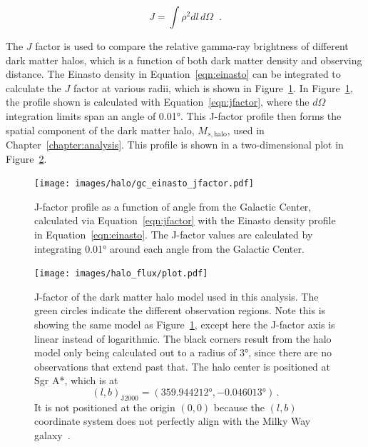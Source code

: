     \begin{equation}\label{eqn:jfactor}
      J = \int \rho^2 dl\,d\Omega \;\; .
    \end{equation}

    The $J$ factor is used to compare the relative gamma-ray brightness of different dark matter halos, which is a function of both dark matter density and observing distance.
    The Einasto density in Equation~\ref{eqn:einasto} can be integrated to calculate the $J$ factor at various radii, which is shown in Figure~\ref{fig:gchalo_jfactor}.
    In Figure~\ref{fig:gchalo_jfactor}, the profile shown is calculated with Equation~\ref{eqn:jfactor}, where the $d\Omega$ integration limits span an angle of \ang{0.01}.
    This J-factor profile then forms the spatial component of the dark matter halo, $M_{s,\textrm{halo}}$, used in Chapter~\ref{chapter:analysis}.
    This profile is shown in a two-dimensional plot in Figure~\ref{fig:halojfactor}.
    
    \begin{figure}[!t]
    \centering
      \texttt{[image: images/halo/gc\_einasto\_jfactor.pdf]}
      \caption[Galactic Center Einasto Halo J-Factor]{
        J-factor profile as a function of angle from the Galactic Center, calculated via Equation~\ref{eqn:jfactor} with the Einasto density profile in Equation~\ref{eqn:einasto}.
        The J-factor values are calculated by integrating \ang{0.01} around each angle from the Galactic Center.
      }
      \label{fig:gchalo_jfactor}
    \end{figure}
  
  \begin{figure}[!t]
    \centering
    \texttt{[image: images/halo\_flux/plot.pdf]}
    \caption[Galactic Center Halo J-Factor Sky Map]{
      J-factor of the dark matter halo model used in this analysis.
      The green circles indicate the different observation regions.
      Note this is showing the same model as Figure~\ref{fig:gchalo_jfactor}, except here the J-factor axis is linear instead of logarithmic.
      The black corners result from the halo model only being calculated out to a radius of \ang{3}, since there are no observations that extend past that.
      The halo center is positioned at Sgr A*, which is at $$(l,b)_{\textrm{J2000}} = (\ang{359.944212}, \ang{-0.046013}) \,.$$
      It is not positioned at the origin $(0,0)$ because the $(l,b)$ coordinate system does not perfectly align with the Milky Way galaxy~\cite{galacticlb}.
    }
    \label{fig:halojfactor}
  \end{figure}

